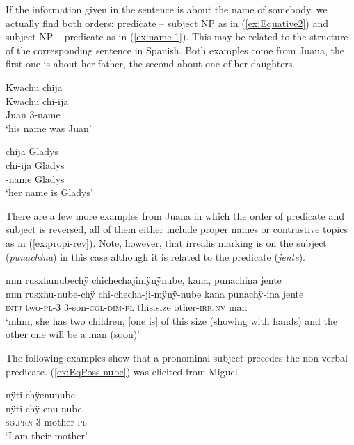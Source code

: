 If the information given in the sentence is about the name of somebody, we actually find both orders: predicate – subject NP as in (\ref{ex:Equative2}) and subject NP – predicate as in (\ref{ex:name-1}). This may be related to the structure of the corresponding sentence in Spanish. Both examples come from Juana, the first one is about her father, the second about one of her daughters.

\ea\label{ex:Equative2}
\begingl 
\glpreamble Kwachu chija\\
\gla Kwachu chi-ija\\ 
\glb Juan 3-name\\ 
\glft ‘his name was Juan’
\trailingcitation{[jxx-p120515l-1.125]}
\xe

\ea\label{ex:name-1}
\begingl
\glpreamble chija Gladys\\
\gla chi-ija Gladys\\
-name Gladys\\
\glft ‘her name is Gladys’
\endgl
\trailingcitation{[jxx-p110923l-2.059]}
\xe

There are a few more examples from Juana in which the order of predicate and subject is reversed, all of them either include proper names or contrastive topics as in (\ref{ex:propi-rev}). Note, however, that irrealis marking is on the subject (\textit{punachina}) in this case although it is related to the predicate (\textit{jente}).

\ea\label{ex:propi-rev}
\begingl
\glpreamble mm rusxhunubechÿ chichechajimÿnÿnube, kana, punachina jente\\
\gla mm rusxhu-nube-chÿ chi-checha-ji-mÿnÿ-nube kana punachÿ-ina jente\\
\glb \textsc{intj} two-\textsc{pl}-3 3-son-\textsc{col}-\textsc{dim}-\textsc{pl} this.size other-\textsc{irr.nv} man\\
\glft ‘mhm, she has two children, [one is] of this size (showing with hands) and the other one will be a man (soon)’
\endgl
\trailingcitation{[jxx-p110923l-1.241]}
\xe

The following examples show that a pronominal subject precedes the non-verbal predicate. (\ref{ex:EqPoss-nube}) was elicited from Miguel.

\ea\label{ex:EqPoss-nube}
\begingl 
\glpreamble nÿti chÿenunube\\
\gla nÿti chÿ-enu-nube\\ 
\textsc{sg.prn} 3-mother-\textsc{pl}\\ 
\glft ‘I am their mother’
\trailingcitation{[mxx-e090728s-3.081]}
\xe

